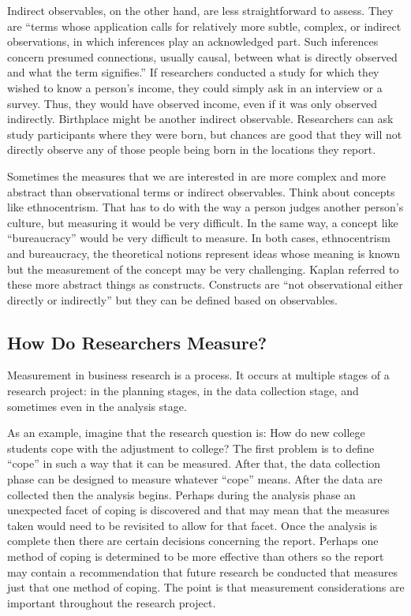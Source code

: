 Indirect observables, on the other hand, are less straightforward to assess. They are ``terms whose application calls for relatively more subtle, complex, or indirect observations, in which inferences play an acknowledged part. Such inferences concern presumed connections, usually causal, between what is directly observed and what the term signifies.'' If researchers conducted a study for which they wished to know a person's income, they could simply ask in an interview or a survey. Thus, they would have observed income, even if it was only observed indirectly. Birthplace might be another indirect observable. Researchers can ask study participants where they were born, but chances are good that they will not directly observe any of those people being born in the locations they report.

Sometimes the measures that we are interested in are more complex and more abstract than observational terms or indirect observables. Think about concepts like ethnocentrism. That has to do with the way a person judges another person's culture, but measuring it would be very difficult. In the same way, a concept like  ``bureaucracy'' would be very difficult to measure. In both cases, ethnocentrism and bureaucracy, the theoretical notions represent ideas whose meaning is known but the measurement of the concept may be very challenging. Kaplan referred to these more abstract things as constructs. Constructs are ``not observational either directly or indirectly'' but they can be defined based on observables.

\subsection{How Do Researchers Measure?}

Measurement in business research is a process. It occurs at multiple stages of a research project: in the planning stages, in the data collection stage, and sometimes even in the analysis stage. 

As an example, imagine that the research question is: How do new college students cope with the adjustment to college? The first problem is to define ``cope'' in such a way that it can be measured. After that, the data collection phase can be designed to measure whatever ``cope'' means. After the data are collected then the analysis begins. Perhaps during the analysis phase an unexpected facet of coping is discovered and that may mean that the measures taken would need to be revisited to allow for that facet. Once the analysis is complete then there are certain decisions concerning the report. Perhaps one method of coping is determined to be more effective than others so the report may contain a recommendation that future research be conducted that measures just that one method of coping. The point is that measurement considerations are important throughout the research project.

